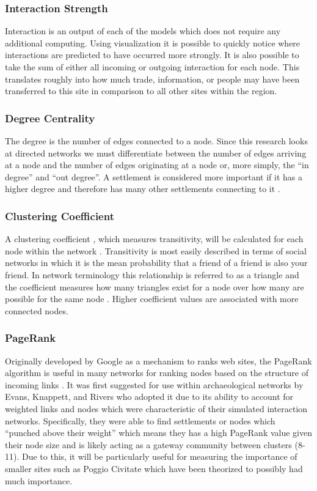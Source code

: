 \documentclass[12pt,a4paper]{thesis}
\begin{document}
\subsubsection{Interaction Strength}
Interaction is an output of each of the models which does not require any additional computing. Using visualization it is possible to quickly notice where interactions are predicted to have occurred more strongly. It is also possible to take the sum of either all incoming or outgoing interaction for each node. This translates roughly into how much trade, information, or people may have been transferred to this site in comparison to all other sites within the region. 

\subsubsection{Degree Centrality}
The degree is the number of edges connected to a node. Since this research looks at directed networks we must differentiate between the number of edges arriving at a node and the number of edges originating at a node or, more simply, the ``in degree'' and ``out degree''. A settlement is considered more important if it has a higher degree and therefore has many other settlements connecting to it \cite[64]{RodComSla06}.  

\subsubsection{Clustering Coefficient}
A clustering coefficient , which measures transitivity, will be calculated for each node within the network \citep{Sar07}. Transitivity is most easily described in terms of social networks in which it is the mean probability that a friend of a friend is also your friend. In network terminology this relationship is referred to as a triangle and the coefficient measures how many triangles exist for a node over how many are possible for the same node \cite[11-12]{New03}. Higher coefficient values are associated with more connected nodes.  

\subsubsection{PageRank}
Originally developed by Google as a mechanism to ranks web sites, the PageRank algorithm is useful in many networks for ranking nodes based on the structure of incoming links \citetext{\citealp{PageRank}; \citealp{LanMey04}}. It was first suggested for use within archaeological networks by Evans, Knappett, and Rivers \citeyearpar{KnaEvaRiv08} who adopted it due to its ability to account for weighted links and nodes which were characteristic of their simulated interaction networks. Specifically, they were able to find settlements or nodes which ``punched above their weight'' which means they has a high PageRank value given their node size and is likely acting as a gateway community between clusters (8-11). Due to this, it will be particularly useful for measuring the importance of smaller sites such as Poggio Civitate which have been theorized to possibly had much importance.
\end{document}
